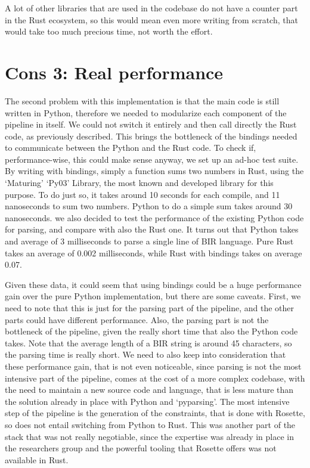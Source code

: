 A lot of other libraries that are used in the codebase do not have a counter part
in the Rust ecosystem, so this would mean even more writing from scratch, that would
take too much precious time, not worth the effort.

\section[Real performance]{Cons 3: Real performance}
The second problem with this implementation is that the main code is still
written in Python, therefore we needed to modularize each component of the pipeline
in itself. We could not switch it entirely and then call directly the Rust code,
as previously described. This brings the bottleneck of the bindings needed to
communicate between the Python and the Rust code. To check if, performance-wise,
this could make sense anyway, we set up an ad-hoc test suite. By writing with bindings,
simply a function sums two numbers in Rust, using the `Maturing' `Py03' Library,
the most known and developed library for this purpose. To do just so, it takes
around 10 seconds for each compile, and 11 nanoseconds to sum two numbers.
Python to do a simple sum takes around 30 nanoseconds. we also decided to test the
performance of the existing Python code for parsing, and compare with also the
Rust one. It turns out that Python takes and average of 3 milliseconds to parse a
single line of BIR language. Pure Rust takes an average of 0.002 milliseconds, while
Rust with bindings takes on average 0.07.

Given these data, it could seem that using bindings could be a huge performance
gain over the pure Python implementation, but there are some caveats. First, we need
to note that this is just for the parsing part of the pipeline, and the other
parts could have different performance. Also, the parsing part is not the
bottleneck of the pipeline, given the really short time that also the Python code
takes. Note that the average length of a BIR string is around 45 characters, so the
parsing time is really short. We need to also keep into consideration that these
performance gain, that is not even noticeable, since parsing is not the most
intensive part of the pipeline, comes at the cost of a more complex codebase,
with the need to maintain a new source code and language, that is less mature than
the solution already in place with Python and `pyparsing'. The most intensive
step of the pipeline is the generation of the constraints, that is done with Rosette,
so does not entail switching from Python to Rust. This was another part of the stack
that was not really negotiable, since the expertise was already in place in the
researchers group and the powerful tooling that Rosette offers was not available
in Rust.


